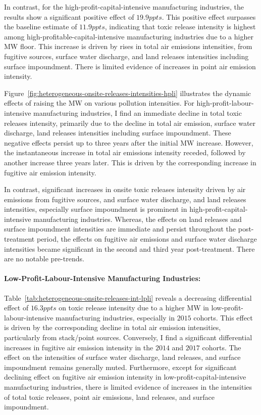 \documentclass{C:/Users/david/OneDrive/Documents/ULMS/PhD/Thesis/chapter3/src/climate_change/latex/Economic_Journal/OUP-EJ}
\begin{document}
    In contrast, for the high-profit-capital-intensive manufacturing industries, the results show a significant positive effect of $19.9ppts$. This positive effect surpasses the baseline estimate of $11.9ppts$, indicating that toxic release intensity is highest among high-profitable-capital-intensive manufacturing industries due to a higher MW floor. This increase is driven by rises in total air emissions intensities, from fugitive sources, surface water discharge, and land releases intensities including surface impoundment. There is limited evidence of increases in point air emission intensity.

    Figure~\ref{fig:heterogeneous-onsite-releases-intensities-hpli} illustrates the dynamic effects of raising the MW on various pollution intensities. For high-profit-labour-intensive manufacturing industries, I find an immediate decline in total toxic releases intensity, primarily due to the decline in total air emission, surface water discharge, land releases intensities including surface impoundment. These negative effects persist up to three years after the initial MW increase. However, the instantaneous increase in total air emissions intensity receded, followed by another increase three years later. This is driven by the corresponding increase in fugitive air emission intensity.
    

    In contrast, significant increases in onsite toxic releases intensity driven by air emissions from fugitive sources, and surface water discharge, and land releases intensities, especially surface impoundment is prominent in high-profit-capital-intensive manufacturing industries. Whereas, the effects on land releases and surface impoundment intensities are immediate and persist throughout the post-treatment period, the effects on fugitive air emissions and surface water discharge intensities became significant in the second and third year post-treatment. There are no notable pre-trends.

    \paragraph{Low-Profit-Labour-Intensive Manufacturing Industries:}
    Table~\ref{tab:heterogeneous-onsite-releases-int-lpli} reveals a decreasing differential effect of $16.3ppts$ on toxic release intensity due to a higher MW in low-profit-labour-intensive manufacturing industries, especially in $2015$ cohorts. This effect is driven by the corresponding decline in total air emission intensities, particularly from stack/point sources. Conversely, I find a significant differential increases in fugitive air emission intensity in the $2014$ and $2017$ cohorts. The effect on the intensities of surface water discharge, land releases, and surface impoundment remains generally muted. Furthermore, except for significant declining effect on fugitive air emission intensity in low-profit-capital-intensive manufacturing industries, there is limited evidence of increases in the intensities of total toxic releases, point air emissions, land releases, and surface impoundment.
    
\end{document}
